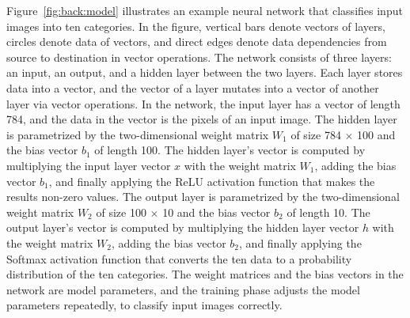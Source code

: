 Figure~\ref{fig:back:model} illustrates an example neural network that
classifies input images into ten categories.
In the figure, vertical bars denote vectors of layers, circles denote data of
vectors, and direct edges denote data dependencies from source to destination
in vector operations.
The network consists of three layers: an input, an output, and a hidden layer
between the two layers.
Each layer stores data into a vector, and the vector of a layer mutates into a
vector of another layer via vector operations.  
In the network, the input layer has a vector of length 784, and the data in the
vector is the pixels of an input image.
The hidden layer is parametrized by the two-dimensional weight matrix $W_1$ of
size 784 $\times$ 100 and the bias vector $b_1$ of length 100.
The hidden layer's vector is computed by multiplying the input layer
vector $x$ with the weight matrix $W_1$, adding the bias vector $b_1$, and
finally applying the ReLU activation function that makes the results non-zero
values.
The output layer is parametrized by the two-dimensional weight matrix $W_2$ of
size 100 $\times$ 10 and the bias vector $b_2$ of length 10.
The output layer's vector is computed by multiplying the hidden
layer vector $h$ with the weight matrix $W_2$, adding the bias vector $b_2$,
and finally applying the Softmax activation function that converts the ten data
to a probability distribution of the ten categories.
The weight matrices and the bias vectors in the network are model parameters,
and the training phase adjusts the model parameters repeatedly, to classify
input images correctly.

